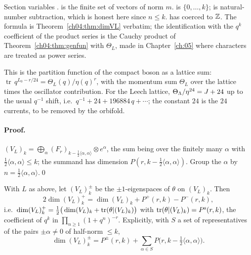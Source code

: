\begin{dictionary}
Section variables .  is the
finite set of vectors of norm $m$.  is $\{0,\dots,k\}$;  is
natural-number subtraction, which is honest here since $n\le k$.  has
 coerced to ${\mathbb{Z}}$. The formula is Theorem~\ref{ch04:thm:dimVL} verbatim; the identification
with the $q^k$ coefficient of the product series is the Cauchy product of
Theorem~\ref{ch04:thm:genfun} with $\Theta_L$, made in Chapter~\ref{ch:05} where characters are
treated as power series.
\end{dictionary}

\begin{physics}
This is the partition function of the compact boson as a lattice sum: $\operatorname{tr}\,q^{L_0-r/24}=\Theta_L(q)/\eta(q)^r$, with the momentum sum $\Theta_L$ over the lattice times the oscillator contribution. For the Leech lattice, $\Theta_{\Lambda}/\eta^{24}=J+24$ up to the usual $q^{-1}$ shift, i.e.\ $q^{-1}+24+196884\,q+\cdots$; the constant $24$ is the $24$ currents, to be removed by the orbifold.
\end{physics}

\paragraph{Proof.} $(V_L)_k=\bigoplus_\alpha(F_r)_{k-\frac12\langle\alpha,\alpha\rangle}\otimes e^\alpha$, the
sum being over the finitely many $\alpha$ with $\tfrac12\langle\alpha,\alpha\rangle\le k$; the summand has
dimension $P(r,k-\tfrac12\langle\alpha,\alpha\rangle)$. Group the $\alpha$ by $n=\tfrac12\langle\alpha,\alpha\rangle$.\qed

\begin{theorem}\label{ch04:thm:dimVLplus}
With $L$ as above, let $(V_L)_k^\pm$ be the $\pm1$-eigenspaces of $\theta$ on $(V_L)_k$. Then
\begin{equation*}
  2\dim(V_L)_k^+=\dim(V_L)_k+P^+(r,k)-P^-(r,k),
\end{equation*}
i.e.\ $\dim(V_L)_k^+=\tfrac12\big(\dim(V_L)_k+\operatorname{tr}(\theta|(V_L)_k)\big)$ with
$\operatorname{tr}(\theta|(V_L)_k)=P^{\mathrm s}(r,k)$, the coefficient of $q^k$ in $\prod_{n\ge1}(1+q^n)^{-r}$.
Explicitly, with $S$ a set of representatives of the pairs $\pm\alpha\neq0$ of half-norm $\le k$,
\begin{equation*}
  \dim(V_L)_k^\pm=P^\pm(r,k)+\sum_{\alpha\in S}P\big(r,k-\tfrac12\langle\alpha,\alpha\rangle\big).
\end{equation*}
\end{theorem}

